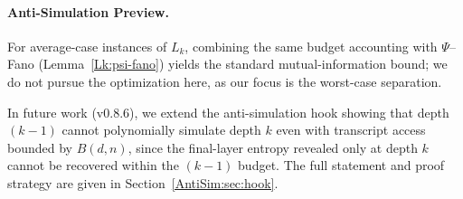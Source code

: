 \paragraph{Anti-Simulation Preview.}
\begin{remark}\label{Lk:avg-fano}
For average-case instances of $L_k$, combining the same budget accounting with $\Psi$--Fano (Lemma~\ref{Lk:psi-fano}) yields the standard mutual-information bound; we do not pursue the optimization here, as our focus is the worst-case separation.
\end{remark}
In future work (v0.8.6), we extend the anti-simulation hook showing that depth $(k{-}1)$ cannot polynomially simulate depth $k$ even with transcript access bounded by $B(d,n)$, since the final-layer entropy revealed only at depth $k$ cannot be recovered within the $(k{-}1)$ budget. The full statement and proof strategy are given in Section~\ref{AntiSim:sec:hook}.

